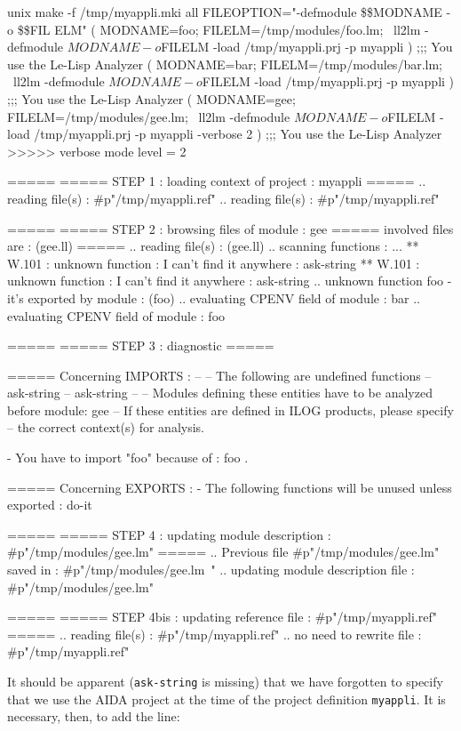 \begin{Longcode*}
unix%
make -f /tmp/myappli.mki all FILEOPTION="-defmodule \$\$MODNAME -o \$\$FIL
ELM"
( MODNAME=foo;  FILELM=/tmp/modules/foo.lm;  \
ll2lm -defmodule $MODNAME -o $FILELM -load /tmp/myappli.prj -p myappli
 )
;;; You use the Le-Lisp Analyzer
( MODNAME=bar;  FILELM=/tmp/modules/bar.lm;  \
ll2lm -defmodule $MODNAME -o $FILELM -load /tmp/myappli.prj -p myappli
 )
;;; You use the Le-Lisp Analyzer
( MODNAME=gee;  FILELM=/tmp/modules/gee.lm;  \
ll2lm -defmodule $MODNAME -o $FILELM -load /tmp/myappli.prj -p myappli
 -verbose 2 )
;;; You use the Le-Lisp Analyzer
>>>>> verbose mode level = 2

=====
===== STEP 1 : loading context of project : myappli
=====
.. reading file(s) : #p"/tmp/myappli.ref"
.. reading file(s) : #p"/tmp/myappli.ref"

=====
===== STEP 2 : browsing files of module : gee
=====          involved files are : (gee.ll)
=====
.. reading file(s) : (gee.ll)
.. scanning functions : ...
** W.101 : unknown function : I can't find it anywhere : ask-string
** W.101 : unknown function : I can't find it anywhere : ask-string
.. unknown function foo - it's exported by module : (foo)
.. evaluating CPENV field of module : bar
.. evaluating CPENV field of module : foo

=====
===== STEP 3 : diagnostic
=====

===== Concerning IMPORTS :
--
-- The following are undefined functions
--      ask-string
--      ask-string
--
-- Modules defining these entities have to be analyzed before module: gee
-- If these entities are defined in ILOG products, please specify
-- the correct context(s) for analysis.


- You have to import "foo" because of :
 foo .

===== Concerning EXPORTS :
- The following functions will be unused unless exported :
     do-it

=====
===== STEP 4 : updating module description : #p"/tmp/modules/gee.lm"
=====
.. Previous file #p"/tmp/modules/gee.lm" saved in :
#p"/tmp/modules/gee.lm~"
.. updating module description file : #p"/tmp/modules/gee.lm"

=====
===== STEP 4bis : updating reference file : #p"/tmp/myappli.ref"
=====
.. reading file(s) : #p"/tmp/myappli.ref"
.. no need to rewrite file : #p"/tmp/myappli.ref"
\end{Longcode*}

It should be apparent ({\tt ask-string} is missing) that we have forgotten to specify that we use the AIDA project at the time of the project definition {\tt myappli}.  It is necessary, then, to add the line:


